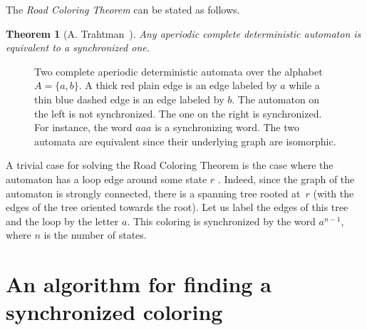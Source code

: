 \documentclass[11pt,a4paper]{article}
\newtheorem{theorem}{Theorem}
\begin{document}
The \emph{Road Coloring Theorem} can be stated as follows.

\begin{theorem}[A. Trahtman~\cite{Trahtman09}] \label{theorem.road}
Any aperiodic complete deterministic automaton is equivalent to a synchronized one.
\end{theorem}

\begin{figure}[htbp]
    \centering
{}
        \caption{Two complete aperiodic deterministic automata
          over the alphabet $A=\{a,b\}$. A thick red plain edge is an edge labeled by
          $a$ while a thin blue dashed edge is an edge labeled by
          $b$. The automaton on the left is not synchronized.  The one
          on the right is synchronized. For instance, the word $aaa$
          is a synchronizing word. The two automata are equivalent
          since their underlying graph are isomorphic.}\label{figure.automate1}
\end{figure}

A trivial case for solving the Road Coloring Theorem is the case where
the automaton has a loop edge around some state $r$
\cite{OBrien81}. Indeed, since the graph of the automaton is strongly
connected, there is a spanning tree rooted at~$r$ (with the edges of
the tree oriented towards the root). Let us label the edges of this
tree and the loop by the letter $a$. This coloring is synchronized by
the word $a^{n-1}$, where $n$ is the number of states.

\section{An algorithm for finding a synchronized coloring} \label{section.algo}
\end{document}
